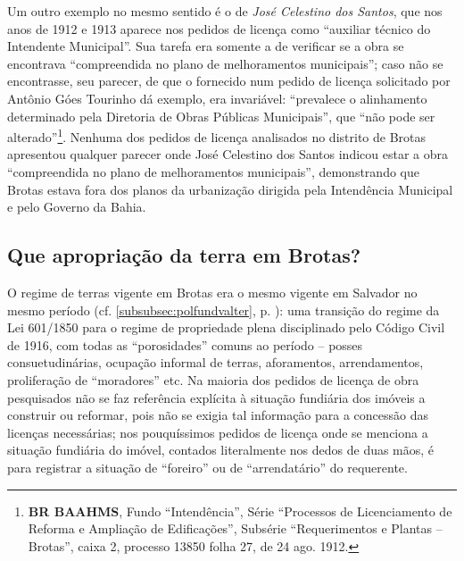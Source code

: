 Um outro exemplo no mesmo sentido é o de \textit{José Celestino dos Santos}, que nos anos de 1912 e 1913 aparece nos pedidos de licença como ``auxiliar técnico do Intendente Municipal''. Sua tarefa era somente a de verificar se a obra se encontrava ``compreendida no plano de melhoramentos municipais''; caso não se encontrasse, seu parecer, de que o fornecido num pedido de licença solicitado por Antônio Góes Tourinho dá exemplo, era invariável: ``prevalece o  alinhamento determinado pela Diretoria de Obras Públicas Municipais'', que ``não pode ser alterado''\footnote{\textbf{BR BAAHMS}, Fundo ``Intendência'', Série ``Processos de Licenciamento de Reforma e Ampliação de Edificações'', Subsérie ``Requerimentos e Plantas – Brotas'', caixa 2, processo 13850 folha 27, de 24 ago. 1912.}. Nenhuma dos pedidos de licença analisados no distrito de Brotas apresentou qualquer parecer onde José Celestino dos Santos indicou estar a obra ``compreendida no plano de melhoramentos municipais'', demonstrando que Brotas estava fora dos planos da urbanização dirigida pela Intendência Municipal e pelo Governo da Bahia.

\subsection{Que apropriação da terra em Brotas?}\label{subsec:apropribrotas}

O regime de terras vigente em Brotas era o mesmo vigente em Salvador no mesmo período (cf. \autoref{subsubsec:polfundvalter}, p. \pageref{subsubsec:polfundvalter}): uma transição do regime da Lei 601/1850 para o regime de propriedade plena disciplinado pelo Código Civil de 1916, com todas as ``porosidades'' comuns ao período -- posses consuetudinárias, ocupação informal de terras, aforamentos, arrendamentos, proliferação de ``moradores'' etc. Na maioria dos pedidos de licença de obra pesquisados não se faz referência explícita à situação fundiária dos imóveis a construir ou reformar, pois não se exigia tal informação para a concessão das licenças necessárias; nos pouquíssimos pedidos de licença onde se menciona a situação fundiária do imóvel, contados literalmente nos dedos de duas mãos, é para registrar a situação de ``foreiro'' ou de ``arrendatário'' do requerente. 

